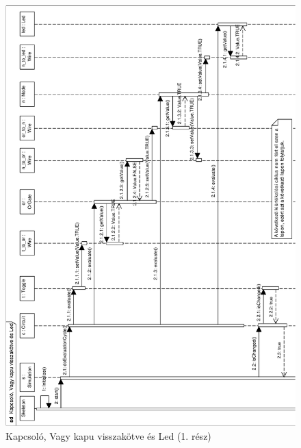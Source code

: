 \begin{figure}[H]
\begin{center}
\includegraphics[width=16cm]{chapters/chapter05/imgs/test5-1.pdf}
\caption{Kapcsoló, Vagy kapu visszakötve és Led (1. rész)}
\label{fig:test5_1}
\end{center}
\end{figure}

